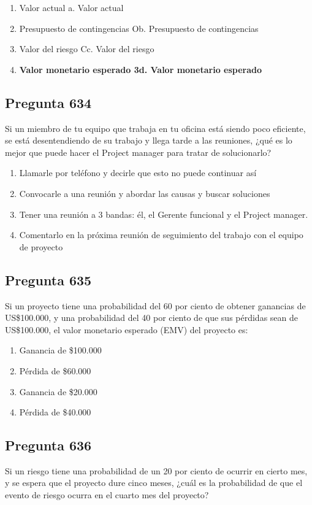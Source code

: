 \documentclass[11pt,a4paper]{article}
\begin{document}
\begin{enumerate}[label=\alph*)]
  \item Valor actual a. Valor actual
  \item Presupuesto de contingencias Ob. Presupuesto de contingencias
  \item Valor del riesgo Cc. Valor del riesgo
  \item \textbf{Valor monetario esperado 3d. Valor monetario esperado}
\end{enumerate}

\subsection*{Pregunta 634}
Si un miembro de tu equipo que trabaja en tu oficina está siendo poco eficiente, se está desentendiendo de su trabajo y llega tarde a las reuniones, ¿qué es lo mejor que puede hacer el Project manager para tratar de solucionarlo?

\begin{enumerate}[label=\alph*)]
  \item Llamarle por teléfono y decirle que esto no puede continuar así
  \item Convocarle a una reunión y abordar las causas y buscar soluciones
  \item Tener una reunión a 3 bandas: él, el Gerente funcional y el Project manager.
  \item Comentarlo en la próxima reunión de seguimiento del trabajo con el equipo de proyecto
\end{enumerate}

\subsection*{Pregunta 635}
Si un proyecto tiene una probabilidad del 60 por ciento de obtener ganancias de US\$100.000, y una probabilidad del 40 por ciento de que sus pérdidas sean de US\$100.000, el valor monetario esperado (EMV) del proyecto es:

\begin{enumerate}[label=\alph*)]
  \item Ganancia de \$100.000
  \item Pérdida de \$60.000
  \item Ganancia de \$20.000
  \item Pérdida de \$40.000
\end{enumerate}

\subsection*{Pregunta 636}
Si un riesgo tiene una probabilidad de un 20 por ciento de ocurrir en cierto mes, y se espera que el proyecto dure cinco meses, ¿cuál es la probabilidad de que el evento de riesgo ocurra en el cuarto mes del proyecto?
\end{document}

